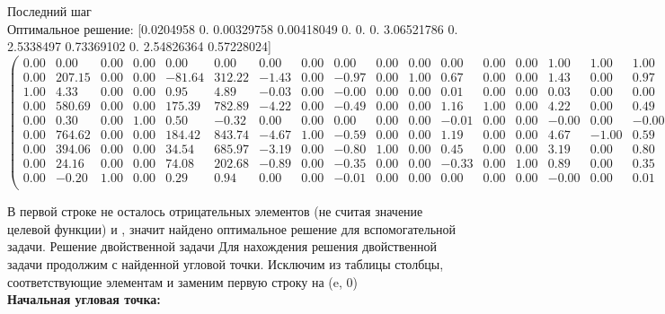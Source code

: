 \documentclass{article}
\begin{document}
\begin{flushleft}
    Последний шаг \\
    Оптимальное решение: 
    [0.0204958  0.         0.00329758 0.00418049 0.         0.
 0.         3.06521786 0.         2.5338497  0.73369102 0.
 2.54826364 0.57228024]
\begin{equation*}
\begin{pmatrix}
 0.00 &   0.00 & 0.00 & 0.00 &   0.00 &   0.00 &  0.00 & 0.00 &  0.00 & 0.00 & 0.00 &  0.00 & 0.00 & 0.00 &  1.00 &  1.00 &  1.00 &  1.00 &  1.00 &  1.00 &  1.00 &  1.00 & 0.00 \\
 0.00 & 207.15 & 0.00 & 0.00 & -81.64 & 312.22 & -1.43 & 0.00 & -0.97 & 0.00 & 1.00 &  0.67 & 0.00 & 0.00 &  1.43 &  0.00 &  0.97 &  0.00 & -1.00 & -0.67 &  0.00 &  0.00 & 0.73 \\
 1.00 &   4.33 & 0.00 & 0.00 &   0.95 &   4.89 & -0.03 & 0.00 & -0.00 & 0.00 & 0.00 &  0.01 & 0.00 & 0.00 &  0.03 &  0.00 &  0.00 &  0.00 &  0.00 & -0.01 &  0.00 &  0.00 & 0.02 \\
 0.00 & 580.69 & 0.00 & 0.00 & 175.39 & 782.89 & -4.22 & 0.00 & -0.49 & 0.00 & 0.00 &  1.16 & 1.00 & 0.00 &  4.22 &  0.00 &  0.49 &  0.00 &  0.00 & -1.16 & -1.00 &  0.00 & 2.55 \\
 0.00 &   0.30 & 0.00 & 1.00 &   0.50 &  -0.32 &  0.00 & 0.00 &  0.00 & 0.00 & 0.00 & -0.01 & 0.00 & 0.00 & -0.00 &  0.00 & -0.00 &  0.00 &  0.00 &  0.01 &  0.00 &  0.00 & 0.00 \\
 0.00 & 764.62 & 0.00 & 0.00 & 184.42 & 843.74 & -4.67 & 1.00 & -0.59 & 0.00 & 0.00 &  1.19 & 0.00 & 0.00 &  4.67 & -1.00 &  0.59 &  0.00 &  0.00 & -1.19 &  0.00 &  0.00 & 3.07 \\
 0.00 & 394.06 & 0.00 & 0.00 &  34.54 & 685.97 & -3.19 & 0.00 & -0.80 & 1.00 & 0.00 &  0.45 & 0.00 & 0.00 &  3.19 &  0.00 &  0.80 & -1.00 &  0.00 & -0.45 &  0.00 &  0.00 & 2.53 \\
 0.00 &  24.16 & 0.00 & 0.00 &  74.08 & 202.68 & -0.89 & 0.00 & -0.35 & 0.00 & 0.00 & -0.33 & 0.00 & 1.00 &  0.89 &  0.00 &  0.35 &  0.00 &  0.00 &  0.33 &  0.00 & -1.00 & 0.57 \\
 0.00 &  -0.20 & 1.00 & 0.00 &   0.29 &   0.94 &  0.00 & 0.00 & -0.01 & 0.00 & 0.00 &  0.00 & 0.00 & 0.00 & -0.00 &  0.00 &  0.01 &  0.00 &  0.00 & -0.00 &  0.00 &  0.00 & 0.00 \\
\end{pmatrix}
\end{equation*}
\end{flushleft}

В первой строке не осталось отрицательных элементов (не считая значение целевой функции) и  , значит найдено оптимальное решение для вспомогательной задачи.
Решение двойственной задачи
Для нахождения решения двойственной задачи продолжим с найденной угловой точки. Исключим из таблицы столбцы, соответствующие элементам   и заменим первую строку на  (e, 0)\\
\textbf{Начальная угловая точка:}
\end{document}
